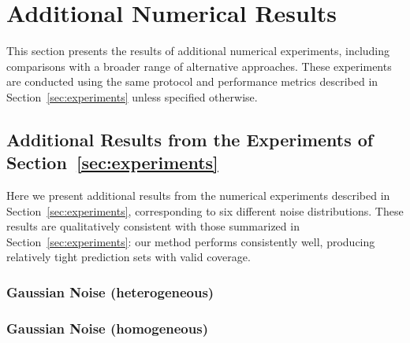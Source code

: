 \clearpage

\section{Additional Numerical Results}
\label{app:additional-experiments}

This section presents the results of additional numerical experiments, including comparisons with a broader range of alternative approaches.
These experiments are conducted using the same protocol and performance metrics described in Section~\ref{sec:experiments} unless specified otherwise. 

\subsection{Additional Results from the Experiments of Section~\ref{sec:experiments}}
\label{app:simulations}

Here we present additional results from the numerical experiments described in Section~\ref{sec:experiments}, corresponding to six different noise distributions. These results are qualitatively consistent with those summarized in Section~\ref{sec:experiments}: our method performs consistently well, producing relatively tight prediction sets with valid coverage.

\subsubsection{Gaussian Noise (heterogeneous)}

\begin{table}[!htbp]
    \centering
    
    \caption{Performance of the proposed TSCP method and alternative conformal prediction approaches on simulated data with $d=10$ outcome variables, as in Figure~\ref{fig:gaussian-heter}. All results are averaged over $200$ trials with their one standard deviation reported in parenthesis.  
    The target coverage level is $0.9$. Coverage below this target is highlighted in \textcolor{red}{red}. For volume, lower is better. Smallest volume size (among those with valid theoretical coverage) is highlighted in \textbf{bold}. TSCP yields the tightest volume while maintaining valid coverage.}
    \label{tab:gaussian-heter}
\end{table}

\clearpage
\subsubsection{Gaussian Noise (homogeneous)}

